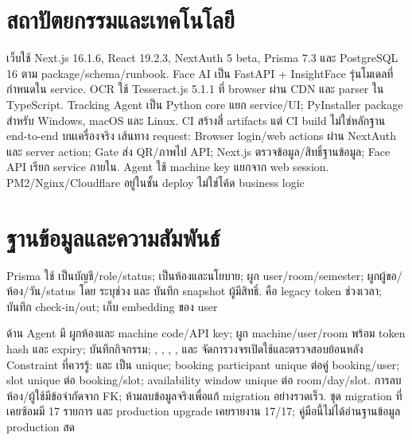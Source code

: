 \chapter{สถาปัตยกรรมและเทคโนโลยี}
เว็บใช้ Next.js 16.1.6, React 19.2.3, NextAuth 5 beta, Prisma 7.3 และ PostgreSQL 16 ตาม package/schema/runbook. Face AI เป็น FastAPI + InsightFace รุ่นโมเดลที่กำหนดใน service. OCR ใช้ Tesseract.js 5.1.1 ที่ browser ผ่าน CDN และ parser ใน TypeScript. Tracking Agent เป็น Python core แยก service/UI; PyInstaller package สำหรับ Windows, macOS และ Linux. CI สร้างสี่ artifacts แต่ CI build ไม่ใช่หลักฐาน end-to-end บนเครื่องจริง
เส้นทาง request: Browser login/web actions ผ่าน NextAuth และ server action; Gate ส่ง QR/ภาพไป API; Next.js ตรวจข้อมูล/สิทธิ์ฐานข้อมูล; Face API เรียก service ภายใน. Agent ใช้ machine key แยกจาก web session. PM2/Nginx/Cloudflare อยู่ในชั้น deploy ไม่ใช่โค้ด business logic

\chapter{ฐานข้อมูลและความสัมพันธ์}
Prisma ใช้  เป็นบัญชี/role/status;  เป็นห้องและนโยบาย;  ผูก user/room/semester;  ผูกผู้ขอ/ห้อง/วัน/status โดย  ระบุช่วง และ  บันทึก snapshot ผู้มีสิทธิ์.  คือ legacy token ช่วงเวลา;  บันทึก check-in/out;  เก็บ embedding ของ user

ด้าน Agent มี  ผูกห้องและ machine code/API key;  ผูก machine/user/room พร้อม token hash และ expiry;  บันทึกกิจกรรม; , , , ,  และ  จัดการวงจรเปิดใช้และตรวจสอบย้อนหลัง
Constraint ที่ควรรู้:  และ  เป็น unique; booking participant unique ต่อคู่ booking/user; slot unique ต่อ booking/slot; availability window unique ต่อ room/day/slot. การลบห้อง/ผู้ใช้มีข้อจำกัดจาก FK; ห้ามลบข้อมูลจริงเพื่อแก้ migration อย่างรวดเร็ว. ชุด migration ที่เคยซ้อมมี 17 รายการ และ production upgrade เคยรายงาน 17/17; คู่มือนี้ไม่ได้อ่านฐานข้อมูล production สด

